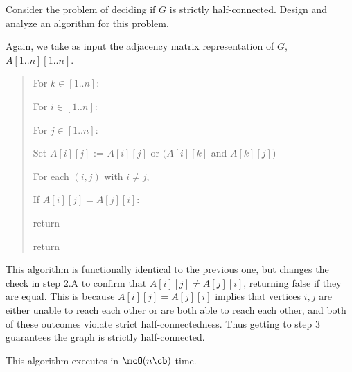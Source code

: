 \documentclass{article}
\begin{document}
\begin{subexercise}
  Consider the problem of deciding if \( G \) is strictly half-connected.
  Design and analyze an algorithm for this problem.
\end{subexercise}

\begin{solution}
Again, we take as input the adjacency matrix representation of \( G \), \( A[1..n][1..n] \).
\begin{quote}
\begin{steps}
  \item For \( k\in [1..n] \): \begin{steps}
    \item For \( i\in [1..n] \): \begin{steps}
      \item For \( j\in [1..n] \): \begin{steps}
        \item Set \( A[i][j] \) := \( A[i][j] \) or \( (A[i][k] \) and \( A[k][j]) \)
      \end{steps}
    \end{steps}
  \end{steps}
  \item For each \( (i,j) \) with \( i\neq j \), \begin{steps}
    \item If \( A[i][j] = A[j][i] \): \begin{steps}
      \item return \boolF
    \end{steps}
  \end{steps}
  \item return \boolT
\end{steps}
\end{quote}
This algorithm is functionally identical to the previous one, but changes the check in step 2.A to confirm that \( A[i][j] \neq A[j][i] \), returning false if they are equal.
This is because \( A[i][j] = A[j][i] \) implies that vertices \( i,j \) are either unable to reach each other or are both able to reach each other, and both of these outcomes violate strict half-connectedness.
Thus getting to step 3 guarantees the graph is strictly half-connected.

This algorithm executes in \( \mcO(n\cb) \) time.
\end{solution}
\pagebreak
\end{document}
